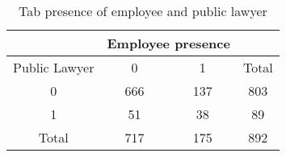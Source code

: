 \documentclass[11pt]{article}
\begin{document}
\begin{table}[H]
  \centering
  \caption{Tab presence of employee and public lawyer}
\begin{tabular}{rccr}
\toprule
      & \multicolumn{2}{c}{Employee presence} &  \\
\midrule
\multicolumn{1}{c}{Public Lawyer} & 0     & 1     & \multicolumn{1}{c}{Total} \\
\multicolumn{1}{c}{0} & 666   & 137   & \multicolumn{1}{c}{803} \\
\multicolumn{1}{c}{1} & 51    & 38    & \multicolumn{1}{c}{89} \\
\multicolumn{1}{c}{Total} & 717   & 175   & \multicolumn{1}{c}{892} \\
\bottomrule
\end{tabular}%

\end{table}%
\end{document}
